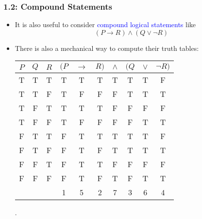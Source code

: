 \documentclass[10pt,english]{beamer}
\begin{document}
  
\begin{frame} \frametitle{1.2: Compound Statements}
  

\begin{itemize}
\setlength\itemsep{2mm}
\item It is also useful to consider \textcolor{blue}{compound logical statements} like $$(P \rightarrow R) \wedge (Q \vee \neg R)$$

\item There is also a mechanical way to compute their truth tables: \\
\begin{center}
\begin{tabular}{|c|c|c|ccccccc|}
\hline
$P$ & $Q$ & $R$
& $(P$ & $\rightarrow$ & $R)$ & $\wedge$ & $(Q$ & $\vee$ & $\neg R)$ \\
\hline
T & T & T & T & T & T & T & T & T & F \\
T & T & F & T & F & F & F & T & T & T \\
T & F & T & T & T & T & F & F & F & F \\
T & F & F & T & F & F & F & F & T & T \\
F & T & T & F & T & T & T & T & T & F \\
F & T & F & F & T & F & T & T & T & T \\
F & F & T & F & T & T & F & F & F & F \\
F & F & F & F & T & F & T & F & T & T \\
& & & 1 & 5 & 2 & 7 & 3 & 6 & 4 \\
\hline
\end{tabular} .
\end{center}

\end{itemize}


\end{frame}
\end{document}
